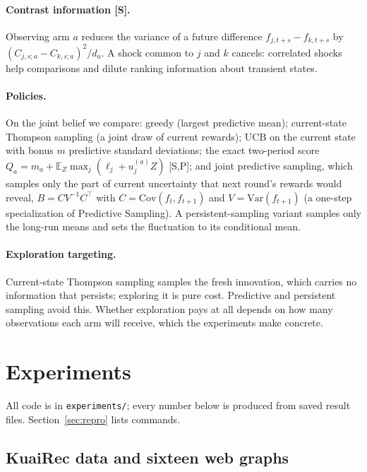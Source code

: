 \documentclass[11pt]{article}
\theoremstyle{definition}
\theoremstyle{remark}
\newcommand{\E}{\mathbb{E}}
\newcommand{\Var}{\mathrm{Var}}
\newcommand{\Cov}{\mathrm{Cov}}
\newcommand{\src}[1]{\textsf{[#1]}}
\begin{document}
\paragraph{Contrast information \src{S}.} Observing arm $a$ reduces the variance of a future difference $f_{j,t+s}-f_{k,t+s}$ by $(C_{j,s;a}-C_{k,s;a})^2/d_a$. A shock common to $j$ and $k$ cancels: correlated shocks help comparisons and dilute ranking information about transient states.

\paragraph{Policies.} On the joint belief we compare: greedy (largest predictive mean); current-state Thompson sampling (a joint draw of current rewards); UCB on the current state with bonus $m$ predictive standard deviations; the exact two-period score $Q_a=m_a+\E_Z\max_j(\ell_j+u^{(a)}_jZ)$ \src{S,P}; and joint predictive sampling, which samples only the part of current uncertainty that next round's rewards would reveal, $B=CV^{-1}C^\top$ with $C=\Cov(f_t,f_{t+1})$ and $V=\Var(f_{t+1})$ (a one-step specialization of Predictive Sampling). A persistent-sampling variant samples only the long-run means and sets the fluctuation to its conditional mean.

\paragraph{Exploration targeting.} Current-state Thompson sampling samples the fresh innovation, which carries no information that persists; exploring it is pure cost. Predictive and persistent sampling avoid this. Whether exploration pays at all depends on how many observations each arm will receive, which the experiments make concrete.

\section{Experiments}\label{sec:exp}

All code is in \texttt{experiments/}; every number below is produced from saved result files. Section~\ref{sec:repro} lists commands.

\subsection{KuaiRec data and sixteen web graphs}
\end{document}
